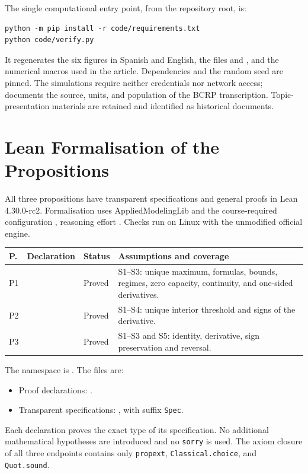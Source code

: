\documentclass[11pt]{article}
\theoremstyle{definition}\newtheorem{assumption}{Assumption}
\begin{document}
The single computational entry point, from the repository root, is:
\begin{verbatim}
python -m pip install -r code/requirements.txt
python code/verify.py
\end{verbatim}
It regenerates the six figures in Spanish and English, the files
 and , and the
numerical macros used in the article. Dependencies and the random seed are
pinned. The simulations require neither credentials nor network access;
 documents the source, units, and population of
the BCRP transcription. Topic-presentation materials are retained and
identified as historical documents.

\section{Lean Formalisation of the Propositions}\label{app:lean}
All three propositions have transparent specifications and general proofs
in Lean 4.30.0-rc2. Formalisation uses AppliedModelingLib and the course-required
configuration , reasoning effort . Checks run
on Linux with the unmodified official engine.

\begin{center}\small
\begin{tabular}{L{.06\linewidth}L{.21\linewidth}L{.15\linewidth}L{.47\linewidth}}
\toprule P. & Declaration & Status & Assumptions and coverage\\\midrule
P1 &  & Proved & S1--S3: unique maximum, formulas, bounds, regimes, zero capacity, continuity, and one-sided derivatives.\\
P2 &  & Proved & S1--S4: unique interior threshold and signs of the derivative.\\
P3 &  & Proved & S1--S3 and S5: identity, derivative, sign preservation and reversal.\\
\bottomrule\end{tabular}
\end{center}
The namespace is . The files are:
\begin{itemize}
\item Proof declarations: .
\item Transparent specifications: ,
with suffix \texttt{Spec}.
\end{itemize}
Each declaration proves the exact type of its specification.
No additional mathematical hypotheses are introduced and no \texttt{sorry}
is used. The axiom closure of all three endpoints contains only
\texttt{propext}, \texttt{Classical.choice}, and \texttt{Quot.sound}.
\end{document}
